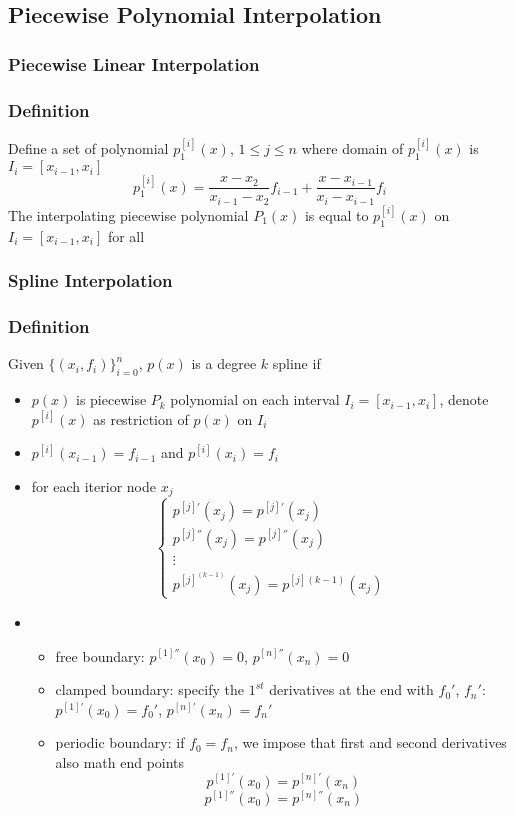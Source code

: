 \documentclass[11pt]{article}
\begin{document}
\subsection{Piecewise Polynomial Interpolation}
\subsubsection{Piecewise Linear Interpolation}
\subsubsection*{Definition}
Define a set of polynomial $p_1^{[i]}(x)$, $1\leq j\leq n$  where domain of $p_1^{[i]}(x)$ is $I_i=[x_{i-1},x_i]$
\[p_1^{[i]}(x) = \frac{x-x_2}{x_{i-1}-x_2}f_{i-1} + \frac{x-x_{i-1}}{x_i - x_{i-1}}f_i\]
The interpolating piecewise polynomial $P_1(x)$ is equal to $p_1^{[i]}(x)$ on $I_i=[x_{i-1},x_i]$ for all 
\subsubsection{Spline Interpolation}
\subsubsection*{Definition}
Given $\{(x_i,f_i)\}_{i=0}^n$, $p(x)$ is a degree $k$ spline if 
\begin{itemize}
  \item $p(x)$ is piecewise $P_k$ polynomial on each interval $I_i=[x_{i-1},x_i]$, denote $p^{[i]}(x)$ as restriction of $p(x)$ on $I_i$
  \item $p^{[i]}(x_{i-1})=f_{i-1}$ and $p^{[i]}(x_i)=f_i$
  \item for each iterior node $x_j$ 
  \[\begin{cases}
    p^{[j]'}(x_j) = p^{[j]'}(x_j) \\
    p^{[j]''}(x_j) = p^{[j]''}(x_j) \\
    \vdots \\
    p^{[j]^{(k-1)}}(x_j) = p^{[j]{(k-1)}}(x_j)
  \end{cases}\] 
  \item 
  \begin{itemize}
    \item free boundary: $p^{[1]''}(x_0) = 0$, $p^{[n]''}(x_n) = 0$
    \item clamped boundary: specify the $1^{st}$ derivatives at the end with $f_0'$, $f_n'$: $p^{[1]'}(x_0)=f_0'$, $p^{[n]'}(x_n)=f_n'$
    \item periodic boundary: if $f_0=f_n$, we impose that first and second derivatives also math end points \[p^{[1]'}(x_0) = p^{[n]'}(x_n)\]\[p^{[1]''}(x_0) = p^{[n]''}(x_n)\]
  \end{itemize}
\end{itemize}
\end{document}
